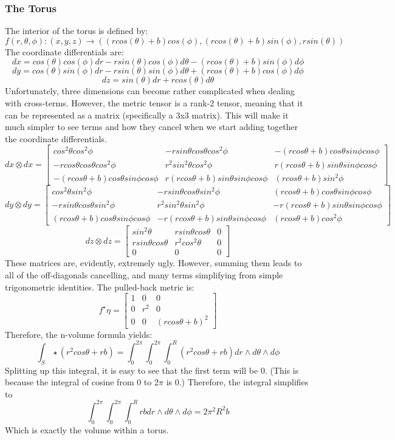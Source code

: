 \documentclass{article}
\begin{document}
\subsubsection{The Torus}
The interior of the torus is defined by:
\[
f(r,\theta,\phi): (x,y,z) \rightarrow ((r cos(\theta)+b)cos(\phi), (r cos(\theta)+b)sin(\phi), r sin(\theta))
\]
The coordinate differentials are:
\[
dx = cos(\theta)cos(\phi)dr - r sin(\theta) cos(\phi) d\theta - (r cos(\theta) + b) sin(\phi) d\phi
\]
\[
dy = cos(\theta)sin(\phi) dr - r sin(\theta) sin(\phi) d\theta + (r cos(\theta) + b) cos(\phi) d\phi
\]
\[
dz = sin(\theta) dr + r cos(\theta) d\theta
\]
Unfortunately, three dimensions can become rather complicated when dealing with cross-terms. However, the metric tensor is a rank-2 tensor, meaning that it can be represented as a matrix (specifically a 3x3 matrix). This will make it much simpler to see terms and how they cancel when we start adding together the coordinate differentials.
\[
dx \otimes dx =
\begin{bmatrix}
cos^2\theta cos^2\phi & -r sin\theta cos \theta cos^2 \phi & -(r cos\theta + b) cos\theta sin\phi cos\phi \\
-r cos\theta cos\theta cos^2\phi & r^2 sin^2\theta cos^2 \phi & r(r cos\theta + b)sin\theta sin\phi cos\phi \\
-(r cos\theta + b) cos\theta sin\phi cos\phi & r(r cos\theta + b)sin\theta sin\phi cos\phi & (r cos\theta + b) sin^2\phi
\end{bmatrix}
\]
\[
dy \otimes dy =
\begin{bmatrix}
cos^2\theta sin^2\phi & -r sin\theta cos \theta sin^2 \phi & (r cos\theta + b) cos\theta sin\phi cos\phi \\
-r sin\theta cos\theta sin^2\phi & r^2 sin^2\theta sin^2 \phi & -r(r cos\theta + b)sin\theta sin\phi cos\phi \\
(r cos\theta + b) cos\theta sin\phi cos\phi & -r(r cos\theta + b)sin\theta sin\phi cos\phi & (r cos\theta + b) cos^2\phi
\end{bmatrix}
\]
\[
dz \otimes dz =
\begin{bmatrix}
sin^2\theta & r sin\theta cos\theta & 0 \\
r sin\theta cos\theta & r^2 cos^2\theta & 0 \\
0 & 0 & 0
\end{bmatrix}
\]
These matrices are, evidently, extremely ugly. However, summing them leads to all of the off-diagonals cancelling, and many terms simplifying from simple trigonometric identities. The pulled-back metric is:
\[
f^{\star}\eta = \begin{bmatrix}
1 & 0 & 0 \\
0 & r^2 & 0 \\
0 & 0 & (r cos\theta + b)^2
\end{bmatrix}
\]
Therefore, the n-volume formula yields:
\[
\int_S \star (r^2 cos\theta + rb) = \int_0^{2\pi}\int_0^{2\pi}\int_0^{R}(r^2 cos\theta + rb) dr \wedge d\theta \wedge d\phi
\]
Splitting up this integral, it is easy to see that the first term will be 0. (This is because the integral of cosine from 0 to 2$\pi$ is 0.) Therefore, the integral simplifies to
\[
\int_0^{2\pi}\int_0^{2\pi}\int_0^{R} rb dr \wedge d\theta \wedge d\phi = 2\pi^2R^2b
\]
Which is exactly the volume within a torus.
\end{document}
